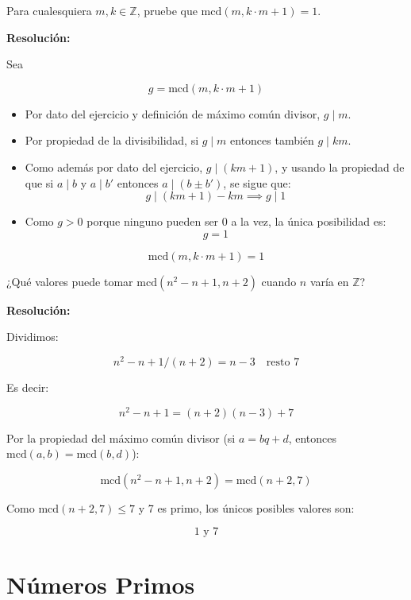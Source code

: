 \documentclass[a4paper,12pt]{article}
\begin{document}
\begin{ejercicio}[title=Ejercicio 6]
Para cualesquiera $m, k \in \mathbb{Z}$, pruebe que $\text{mcd}(m, k \cdot m + 1) = 1$.

\tcblower
\textbf{Resolución:}

Sea 

\[
g = \text{mcd}(m, k \cdot m + 1)
\]

\begin{itemize}
    \item Por dato del ejercicio y definición de máximo común divisor, $g \mid m$.
    \item Por propiedad de la divisibilidad, si $g \mid m$ entonces también $g \mid k m$.
    \item Como además por dato del ejercicio, $g \mid (k m + 1)$, y usando la propiedad de que si $a \mid b$ y $a \mid b'$ entonces $a \mid (b \pm b')$, se sigue que:
    \[
    g \mid (k m + 1) - k m \implies g \mid 1
    \]
    \item Como $g > 0$ porque ninguno pueden ser 0 a la vez, la única posibilidad es:
    \[
    g = 1
    \]
\end{itemize}

\[
\boxed{\text{mcd}(m, k \cdot m + 1) = 1}
\]

\end{ejercicio}

\begin{ejercicio}[title=Ejercicio 7]
¿Qué valores puede tomar $\text{mcd}(n^2 - n + 1, n + 2)$ cuando $n$ varía en $\mathbb{Z}$?

\tcblower
\textbf{Resolución:}

Dividimos:

\[
n^2 - n + 1 / (n + 2) = n - 3 \quad \text{resto } 7
\]

Es decir:

\[
n^2 - n + 1 = (n + 2)(n - 3) + 7
\]

Por la propiedad del máximo común divisor (si $a = b q + d$, entonces $\text{mcd}(a,b) = \text{mcd}(b,d)$):

\[
\text{mcd}(n^2 - n + 1, n + 2) = \text{mcd}(n + 2, 7)
\]

Como $\text{mcd}(n+2, 7) \le 7$ y 7 es primo, los únicos posibles valores son:

\[
\boxed{1 \text{ y } 7}
\]

\end{ejercicio}

\section{Números Primos}
\end{document}
